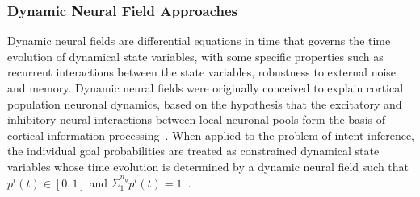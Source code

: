 \documentclass[conference]{IEEEtran}
\begin{document}
\subsubsection{Dynamic Neural Field Approaches}
Dynamic neural fields are differential equations in time that governs the time evolution of dynamical state variables, with some specific properties such as recurrent interactions between the state variables, robustness to external noise and memory. Dynamic neural fields were originally conceived to explain cortical population neuronal dynamics, based on the hypothesis that the excitatory and inhibitory neural interactions between local neuronal pools form the basis of cortical information processing~\citep{schoner2008dynamical}. 
When applied to the problem of intent inference, the individual goal probabilities are treated as constrained dynamical state variables whose time evolution is determined by a dynamic neural field such that $p^i(t) \in [0, 1]$ and $\Sigma_{1}^{n_g}p^{i}(t) = 1$~\citep{gopinath2017disamb}. 
\end{document}
